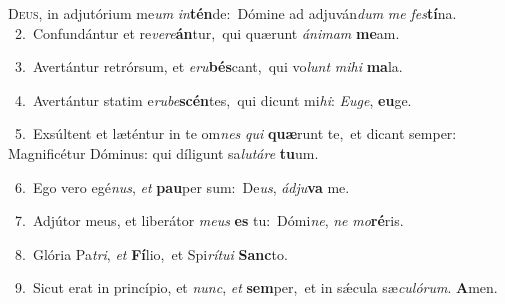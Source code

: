 \lettrine{\initial\textcolor{\initialcolor}{D}}{eus,} in adjutórium me\textit{um} \textit{in}\-\textbf{tén}de:~\star Dómine ad adjuván\textit{dum} \textit{me} \textit{fes}\-\textbf{tí}na.\\
{\numbfont\textcolor{\numbcolor}{~2.}}~Confundántur et re\-\textit{ve}\-\textit{re}\textbf{án}tur,~\star qui quærunt \textit{á}\-\textit{ni}\textit{mam} \textbf{me}\-am.\par
{\numbfont\textcolor{\numbcolor}{~3.}}~Avertántur retrórsum, et \textit{e}\-\textit{ru}\textbf{bés}cant,~\star qui vo\textit{lunt} \textit{mi}\-\textit{hi} \textbf{ma}\-la.\par
{\numbfont\textcolor{\numbcolor}{~4.}}~Avertántur statim e\-\textit{ru}\-\textit{be}\textbf{scén}tes,~\star qui dicunt mi\-\textit{hi}\-: \textit{Eu}\-\textit{ge}, \textbf{eu}\-ge.\par
{\numbfont\textcolor{\numbcolor}{~5.}}~Exsúltent et læténtur in te om\textit{nes} \textit{qui} \textbf{quæ}\-runt te,~\star et dicant semper: Magnificétur Dóminus: qui díligunt sa\-\textit{lu}\-\textit{tá}\textit{re} \textbf{tu}\-um.\par
{\numbfont\textcolor{\numbcolor}{~6.}}~Ego vero egé\-\textit{nus}\-, \textit{et} \textbf{pau}\-per sum:~\star De\-\textit{us}\-, \textit{ád}\-\textit{ju}\textbf{va} me.\par
{\numbfont\textcolor{\numbcolor}{~7.}}~Adjútor meus, et liberátor \textit{me}\-\textit{us} \textbf{es} tu:~\star Dómi\-\textit{ne}\-, \textit{ne} \textit{mo}\-\textbf{ré}ris.\par
{\numbfont\textcolor{\numbcolor}{~8.}}~Glória Pa\-\textit{tri}\-, \textit{et} \textbf{Fí}\-lio,~\star et Spi\-\textit{rí}\-\textit{tu}\textit{i} \textbf{Sanc}\-to.\par
{\numbfont\textcolor{\numbcolor}{~9.}}~Sicut erat in princípio, et \textit{nunc}\-, \textit{et} \textbf{sem}\-per,~\star et in sǽcula sæ\-\textit{cu}\-\textit{ló}\textit{rum}. \textbf{A}\-men.\par
